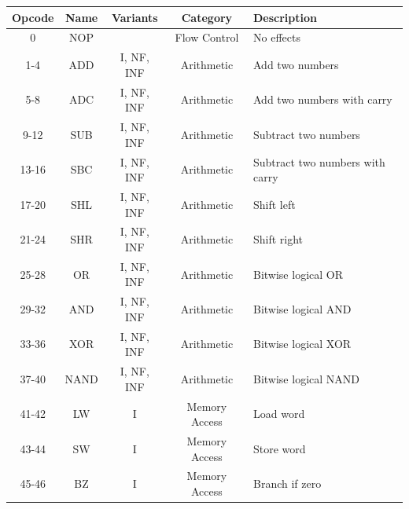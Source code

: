 \begin{table}[H]
    \centering
    \begin{tabular}{|c|c|c|c|l|} 
        \hline
        \textbf{Opcode} & \textbf{Name} & \textbf{Variants} & \textbf{Category} & \textbf{Description}             \\ 
        \hline
        0               & NOP           &                   & Flow Control      & No effects                       \\ 
        \hline
        1-4             & ADD           & I, NF, INF        & Arithmetic        & Add two numbers                  \\ 
        \hline
        5-8             & ADC           & I, NF, INF        & Arithmetic        & Add two numbers with carry       \\ 
        \hline
        9-12            & SUB           & I, NF, INF        & Arithmetic        & Subtract two numbers             \\ 
        \hline
        13-16           & SBC           & I, NF, INF        & Arithmetic        & Subtract two numbers with carry  \\ 
        \hline
        17-20           & SHL           & I, NF, INF        & Arithmetic        & Shift left                       \\ 
        \hline
        21-24           & SHR           & I, NF, INF        & Arithmetic        & Shift right                      \\ 
        \hline
        25-28           & OR            & I, NF, INF        & Arithmetic        & Bitwise logical OR               \\ 
        \hline
        29-32           & AND           & I, NF, INF        & Arithmetic        & Bitwise logical AND              \\ 
        \hline
        33-36           & XOR           & I, NF, INF        & Arithmetic        & Bitwise logical XOR              \\ 
        \hline
        37-40           & NAND          & I, NF, INF        & Arithmetic        & Bitwise logical NAND             \\ 
        \hline
        41-42           & LW            & I                 & Memory Access     & Load word                        \\ 
        \hline
        43-44           & SW            & I                 & Memory Access     & Store word                       \\ 
        \hline
        45-46           & BZ            & I                 & Memory Access     & Branch if zero                   \\ 

\end{tabular}
\end{table}
